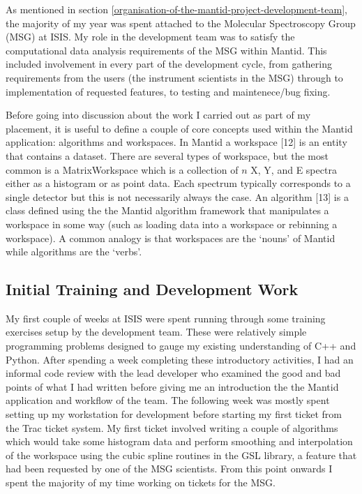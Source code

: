 \documentclass[paper=a4, fontsize=11pt]{scrartcl}	%
\numberwithin{equation}{section}															%
\numberwithin{figure}{section}																%
\numberwithin{table}{section}
\begin{document}
As mentioned in section \ref{organisation-of-the-mantid-project-development-team}, the
majority of my year was spent attached to the Molecular Spectroscopy
Group (MSG) at ISIS. My role in the development team was to satisfy the
computational data analysis requirements of the MSG within Mantid. This
included involvement in every part of the development cycle, from
gathering requirements from the users (the instrument scientists in the
MSG) through to implementation of requested features, to testing and
maintenece/bug fixing.

Before going into discussion about the work I carried out as part of my
placement, it is useful to define a couple of core concepts used within
the Mantid application: algorithms and workspaces. In Mantid a workspace
{[}12{]} is an entity that contains a dataset. There are several types
of workspace, but the most common is a MatrixWorkspace which is a
collection of $n$ X, Y, and E spectra either as a histogram or as point
data. Each spectrum typically corresponds to a single detector but this is
not necessarily always the case. An algorithm {[}13{]} is a class
defined using the the Mantid algorithm framework that manipulates a
workspace in some way (such as loading data into a workspace or
rebinning a workspace). A common analogy is that workspaces are the
`nouns' of Mantid while algorithms are the `verbs'.

\subsection{Initial Training and Development
Work}\label{initial-training-and-development-work}

My first couple of weeks at ISIS were spent running through some
training exercises setup by the development team. These were relatively
simple programming problems designed to gauge my existing understanding
of C++ and Python. After spending a week completing these introductory
activities, I had an informal code review with the lead developer who
examined the good and bad points of what I had written before giving me
an introduction the the Mantid application and workflow of the team. The
following week was mostly spent setting up my workstation for
development before starting my first ticket from the Trac ticket system.
My first ticket involved writing a couple of algorithms which would take
some histogram data and perform smoothing and interpolation of the
workspace using the cubic spline routines in the GSL library, a feature
that had been requested by one of the MSG scientists. From this point
onwards I spent the majority of my time working on tickets for the MSG.
\end{document}
